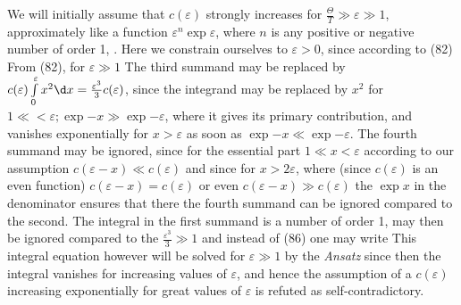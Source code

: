 \begin{paper}{1}
We will initially assume that $c(\varepsilon)$ strongly increases for $\frac{\Theta}{T}\gg\varepsilon\gg 1$, approximately like a function $\varepsilon^n\exp{\varepsilon}$, where $n$ is any positive or negative number of order 1, . Here we constrain ourselves to $\varepsilon>0$, since according to (82)
From (82), for $\varepsilon\gg 1$
The third summand may be replaced by $c(\varepsilon)\int\limits_0^\varepsilon x^2\dx = \frac{\varepsilon^3}{3}c(\varepsilon)$, since the integrand may be replaced by $x^2$ for $1\ll<\varepsilon; \exp{-x}\gg\exp{-\varepsilon}$, where it gives its primary contribution, and vanishes exponentially for $x>\varepsilon$ as soon as $\exp{-x}\ll\exp{-\varepsilon}$. The fourth summand may be ignored, since for the essential part $1\ll x<\varepsilon$
according to our assumption $c(\varepsilon-x)\ll c(\varepsilon)$ and since for $x>2\varepsilon$, where (since $c(\varepsilon)$ is an even function) $c(\varepsilon-x)=c(\varepsilon)$ or even $c(\varepsilon-x)\gg c(\varepsilon)$ the $\exp{x}$ in the denominator ensures that there the fourth summand can be ignored compared to the second. The integral in the first summand is a number of order 1, may then be ignored compared to the $\frac{\varepsilon^3}{3}\gg 1$ and instead of (86) one may write
This integral equation however will be solved for $\varepsilon\gg 1$ by the \textit{Ansatz}
since then the integral vanishes for increasing values of $\varepsilon$, and hence the assumption of a $c(\varepsilon)$ increasing exponentially for great values of $\varepsilon$ is refuted as self-contradictory.


\end{paper}
